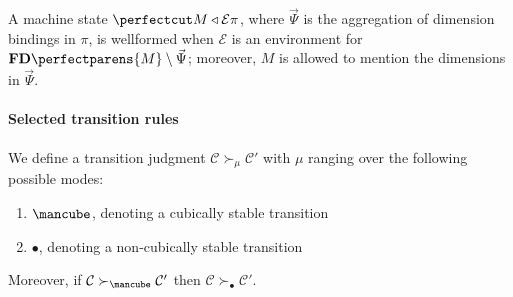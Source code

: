 \documentclass{article}
\newcommand\Clo[2]{#1\triangleleft{#2}}
\newcommand\FreeDims[1]{\mathbf{FD}\perfectparens{#1}}
\newcommand\Cfg[3]{\cut{\Clo{#1}{#2}}{#3}}
\newcommand\Stable{\text{\mancube}}
\newcommand\NonStable{\bullet}
\newcommand\Step[3]{{#2}\mathrel{\succ_{#1}}{#3}}
\begin{document}
A machine state $\Cfg{M}{\mathcal{E}}{\pi}$, where $\vec{\Psi}$ is the
aggregation of dimension bindings in $\pi$, is wellformed when
$\mathcal{E}$ is an environment for $\FreeDims{M}\setminus\vec{\Psi}$;
moreover, $M$ is allowed to mention the dimensions in $\vec{\Psi}$.

\paragraph{Selected transition rules}

We define a transition judgment
$\Step{\mu}{\mathcal{C}}{\mathcal{C}'}$ with $\mu$ ranging over
the following possible modes:
\begin{enumerate}
\item $\Stable$, denoting a cubically stable transition
\item $\NonStable$, denoting a non-cubically stable transition
\end{enumerate}

Moreover, if $\Step{\Stable}{\mathcal{C}}{\mathcal{C}'}$ then
$\Step{\NonStable}{\mathcal{C}}{\mathcal{C}'}$.
\end{document}

